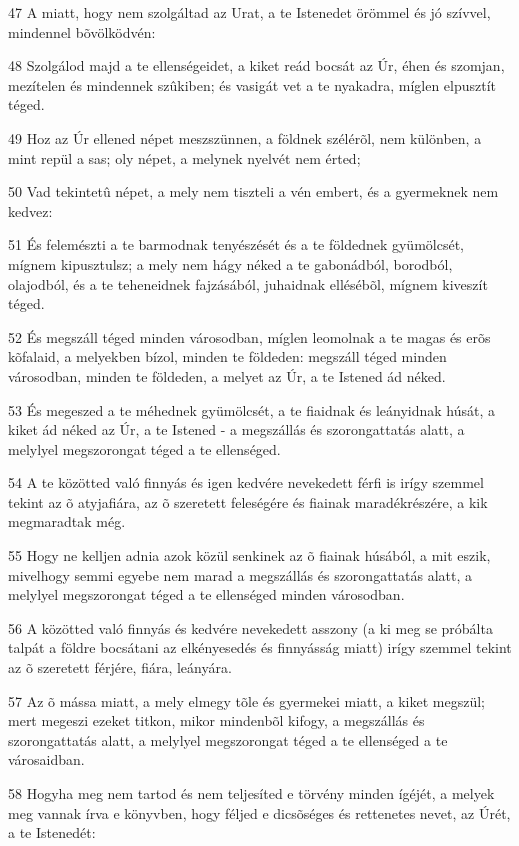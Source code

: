 \par 47 A miatt, hogy nem szolgáltad az Urat, a te Istenedet örömmel és jó szívvel, mindennel bõvölködvén:
\par 48 Szolgálod majd a te ellenségeidet, a kiket reád bocsát az Úr, éhen és szomjan, mezítelen és mindennek szûkiben; és vasigát vet a te nyakadra, míglen elpusztít téged.
\par 49 Hoz az Úr ellened népet meszszünnen, a földnek szélérõl, nem különben, a mint repül a  sas; oly népet, a melynek nyelvét nem érted;
\par 50 Vad tekintetû népet, a mely nem tiszteli a vén embert, és a gyermeknek nem kedvez:
\par 51 És felemészti a te barmodnak tenyészését és a te földednek gyümölcsét, mígnem kipusztulsz; a mely nem hágy néked a te gabonádból, borodból, olajodból, és a te teheneidnek fajzásából, juhaidnak ellésébõl, mígnem kiveszít téged.
\par 52 És megszáll téged minden városodban, míglen leomolnak a te magas és erõs kõfalaid, a melyekben bízol, minden te földeden: megszáll téged minden városodban, minden te földeden, a melyet az Úr, a te Istened ád néked.
\par 53 És megeszed a te méhednek gyümölcsét, a te fiaidnak és leányidnak húsát, a kiket ád néked az Úr, a te Istened - a megszállás és szorongattatás alatt, a melylyel megszorongat téged a te ellenséged.
\par 54 A te közötted való finnyás és igen kedvére nevekedett férfi is irígy szemmel tekint az õ atyjafiára, az õ szeretett feleségére és fiainak maradékrészére, a kik megmaradtak még.
\par 55 Hogy ne kelljen adnia azok közül senkinek az õ fiainak húsából, a mit eszik, mivelhogy semmi egyebe nem marad a megszállás és szorongattatás alatt, a melylyel megszorongat téged a te ellenséged minden városodban.
\par 56 A közötted való finnyás és kedvére nevekedett asszony (a ki meg se próbálta talpát a földre bocsátani az elkényesedés és finnyásság miatt) irígy szemmel tekint az õ szeretett férjére, fiára, leányára.
\par 57 Az õ mássa miatt, a mely elmegy tõle és gyermekei miatt, a kiket megszül; mert megeszi ezeket titkon, mikor mindenbõl kifogy, a megszállás és szorongattatás alatt, a melylyel megszorongat téged a te ellenséged a te városaidban.
\par 58 Hogyha meg nem tartod és nem teljesíted e törvény minden ígéjét, a melyek meg vannak írva e könyvben, hogy féljed e dicsõséges és rettenetes nevet, az Úrét, a te Istenedét:
